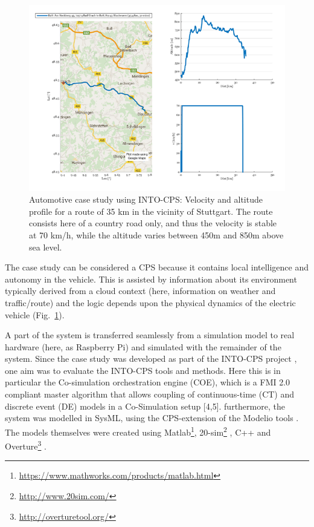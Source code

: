 \begin{figure}[!ht]
	\centering
		\includegraphics[width=0.9 \textwidth]{./figures/auto}
	\caption{Automotive case study using INTO-CPS: Velocity and altitude profile for a route of 35 km in the vicinity of Stuttgart. The route consists here of a country road only, and thus the velocity is stable at 70 km/h, while the altitude varies between 450m and 850m above sea level.}
	\label{fig:auto}
\end{figure}

The case study can be considered a CPS because it contains local intelligence and autonomy in the vehicle. This is assisted by information about its environment typically derived from a cloud context (here, information on weather and traffic/route) and the logic depends upon the physical dynamics of the electric vehicle (Fig.~\ref{fig:auto}).

A part of the system is transferred seamlessly from a simulation model to real hardware (here, as Raspberry Pi) and simulated with the remainder of the system. Since the case study was developed as part of the INTO-CPS project \cite{Fitzgerald&15,Larsen&16a,Larsen&16c,Larsen&16e,Larsen&17a}, one aim was to evaluate the INTO-CPS tools and methods. Here this is in particular the Co-simulation orchestration engine (COE), which is a FMI 2.0 compliant master algorithm that allows coupling of continuous-time (CT) and discrete event (DE) models in a Co-Simulation setup [4,5].  furthermore, the system was modelled in SysML, using the CPS-extension of the Modelio tools \cite{Bagnato&15}. The models themselves were created using Matlab\footnote{\url{https://www.mathworks.com/products/matlab.html}}, 20-sim\footnote{\url{http://www.20sim.com/}} \cite{Kleijn06}, C++ and Overture\footnote{\url{http://overturetool.org/}} \cite{Larsen&10a}.

